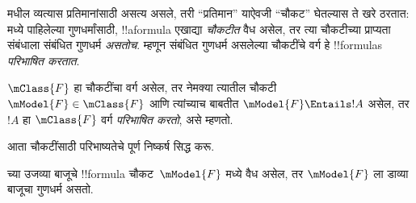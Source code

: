 \documentclass[../../../include/open-logic-section]{subfiles}
\begin{document}


 मधील व्यत्यास प्रतिमानांसाठी
असत्य असले, तरी ``प्रतिमान'' याऐवजी ``चौकट'' घेतल्यास
ते खरे ठरतात:  मध्ये पाहिलेल्या
गुणधर्मांसाठी, !!a{formula} एखाद्या \emph{चौकटीत} वैध
असेल, तर त्या चौकटीच्या प्राप्यता संबंधाला संबंधित गुणधर्म
\emph{असतोच}. म्हणून संबंधित गुणधर्म असलेल्या चौकटींचे
वर्ग हे !!{formula}s \emph{परिभाषित करतात}.

\begin{defn}
  $\mClass{F}$ हा चौकटींचा वर्ग असेल, तर नेमक्या
  त्यातील चौकटी~$\mModel{F} \in \mClass{F}$
  आणि त्यांच्याच बाबतीत $\mModel{F} \Entails !A$ असेल,
  तर $!A$ हा $\mClass{F}$ वर्ग \emph{परिभाषित करतो},
  असे म्हणतो.
\end{defn}

आता चौकटींसाठी परिभाष्यतेचे पूर्ण निष्कर्ष सिद्ध करू.

\begin{thm}
 च्या उजव्या बाजूचे !!{formula}
चौकट~$\mModel{F}$ मध्ये वैध असेल, तर $\mModel{F}$ ला
डाव्या बाजूचा गुणधर्म असतो.
\end{thm}
\end{document}
